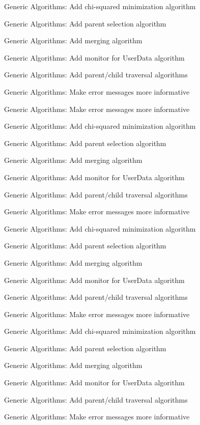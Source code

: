 
\begin{DoxyRefList}
\item[\label{todo__todo000001}%
\hypertarget{todo__todo000001}{}%
Namespace \hyperlink{namespace_h_a_l}{H\+A\+L} ]Generic Algorithms\+: Add chi-\/squared minimization algorithm 

Generic Algorithms\+: Add parent selection algorithm 

Generic Algorithms\+: Add merging algorithm 

Generic Algorithms\+: Add monitor for User\+Data algorithm 

Generic Algorithms\+: Add parent/child traversal algorithms 

Generic Algorithms\+: Make error messages more informative 

Generic Algorithms\+: Make error messages more informative 

Generic Algorithms\+: Add chi-\/squared minimization algorithm 

Generic Algorithms\+: Add parent selection algorithm 

Generic Algorithms\+: Add merging algorithm 

Generic Algorithms\+: Add monitor for User\+Data algorithm 

Generic Algorithms\+: Add parent/child traversal algorithms 

Generic Algorithms\+: Make error messages more informative 

Generic Algorithms\+: Add chi-\/squared minimization algorithm 

Generic Algorithms\+: Add parent selection algorithm 

Generic Algorithms\+: Add merging algorithm 

Generic Algorithms\+: Add monitor for User\+Data algorithm 

Generic Algorithms\+: Add parent/child traversal algorithms 

Generic Algorithms\+: Make error messages more informative 

Generic Algorithms\+: Add chi-\/squared minimization algorithm 

Generic Algorithms\+: Add parent selection algorithm 

Generic Algorithms\+: Add merging algorithm 

Generic Algorithms\+: Add monitor for User\+Data algorithm 

Generic Algorithms\+: Add parent/child traversal algorithms 

Generic Algorithms\+: Make error messages more informative 


\end{DoxyRefList}
